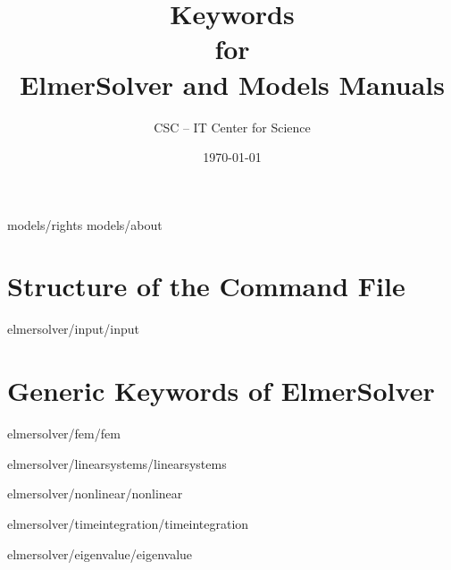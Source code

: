 \documentclass[a4paper,english,10pt]{report}    %
\title{\Huge{\bf Keywords \\ for \\ ElmerSolver and Models Manuals}}
\author{CSC -- IT Center for Science}
\date{\today}
\newcommand{\Include}{} %
\begin{document}
\maketitle


\begin{versiona}
\Include{models/rights}
\Include{models/about}


\pagestyle{empty}



\setcounter{secnumdepth}{2}
\setcounter{tocdepth}{1}  

\tableofcontents
\end{versiona}



\newpage
\pagestyle{fancy}


\clearpage
{}



\chapter{Structure of the Command File}

\graphicspath{{./}{input/}}
\Include{elmersolver/input/input}

\chapter{Generic Keywords of ElmerSolver}
\begin{versiona}
\graphicspath{{./}{fem/}}
\Include{elmersolver/fem/fem}
\end{versiona}

\graphicspath{{./}{linearsystems/}}
\Include{elmersolver/linearsystems/linearsystems}

\graphicspath{{./}{nonlinear/}}
\Include{elmersolver/nonlinear/nonlinear}

\graphicspath{{./}{timeintegration/}}
\Include{elmersolver/timeintegration/timeintegration}

\graphicspath{{./}{eigenvalue/}}
\Include{elmersolver/eigenvalue/eigenvalue}
\end{document}
